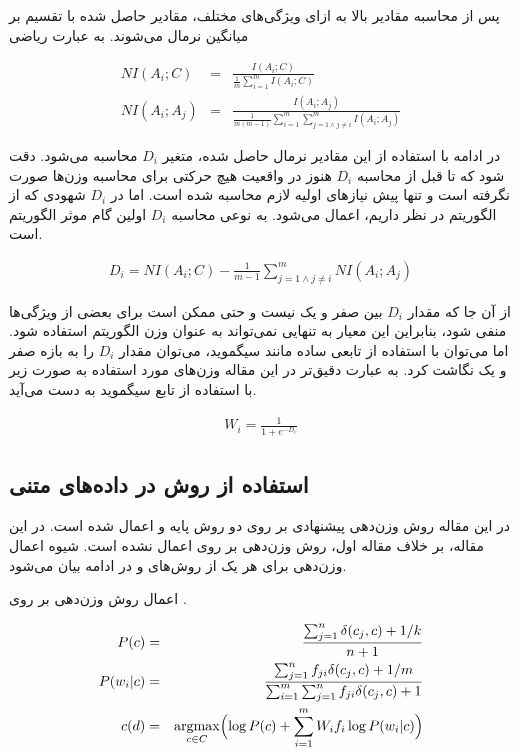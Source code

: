 \documentclass[12pt, a4paper]{article}
\DeclareMathOperator*{\argmax}{argmax}
\begin{document}
پس از محاسبه مقادیر بالا به ازای ویژگی‌های مختلف، مقادیر حاصل شده با تقسیم بر میانگین نرمال می‌شوند.
به عبارت ریاضی

\begin{eqnarray}
    NI(A_i; C) & = & \frac{I(A_i; C)}{\frac{1}{m}\sum_{i=1}^{m}I(A_i; C)} \\
    NI(A_i; A_j) & = & \frac{I(A_i; A_j)}{\frac{1}{m(m-1)}\sum_{i=1}^{m}\sum_{j=1 \wedge  j\neq i}^{m} I(A_i; A_j)}
\end{eqnarray}

در ادامه با استفاده از این مقادیر نرمال حاصل شده، متغیر $D_i$ محاسبه می‌شود. دقت شود که تا قبل از محاسبه
$D_i$ هنوز در واقعیت هیچ حرکتی برای محاسبه وزن‌ها صورت نگرفته است و تنها پیش نیاز‌های اولیه لازم محاسبه شده است.
اما در $D_i$ شهودی که از الگوریتم در نظر داریم، اعمال می‌شود. به نوعی محاسبه $D_i$ اولین گام موثر الگوریتم است.

\begin{eqnarray}
    D_i = NI(A_i; C) - \frac{1}{m-1} \sum_{j=1 \wedge j\neq i}^{m} NI(A_i; A_j)
\end{eqnarray}

از آن جا که مقدار $D_i$ بین صفر و یک نیست و حتی ممکن است برای بعضی از ویژگی‌ها منفی شود، بنابراین این معیار
به تنهایی نمی‌تواند به عنوان وزن الگوریتم  استفاده شود. اما می‌توان با استفاده از تابعی ساده
مانند سیگموید، می‌توان مقدار $D_i$ را به بازه صفر و یک نگاشت کرد. به عبارت دقیق‌تر در این مقاله وزن‌های مورد استفاده
به صورت زیر با استفاده از تابع سیگموید به دست می‌آید.

\begin{eqnarray}
    W_i = \frac{1}{1+e^{-D_i}}
\end{eqnarray}

\subsection*{استفاده از روش  در داده‌های متنی}

در این مقاله روش وزن‌دهی پیشنهادی بر روی دو روش پایه  و 
اعمال شده است. در این مقاله، بر خلاف مقاله اول، روش وزن‌دهی بر روی 
اعمال نشده است. شیوه اعمال وزن‌دهی برای هر یک از روش‌های  و 
در ادامه بیان می‌شود.

اعمال روش وزن‌دهی بر روی .

\begin{eqnarray}
    P(c) & = & \frac{\sum_{j=1}^{n}\delta(c_j, c) + 1/k}{n+1} \\
    P(w_i|c) & = & \frac{\sum_{j=1}^{n} f_{ji}\delta(c_j, c) + 1/m}{\sum_{i=1}^{m}\sum_{j=1}^{n}f_{ji}\delta(c_j,c)+1} \\
    c(d) & = & \argmax_{c \in C} \Bigl(\log P(c) + \sum_{i=1}^{m} W_i f_i \log P(w_i| c)\Bigr)
\end{eqnarray}
\end{document}

